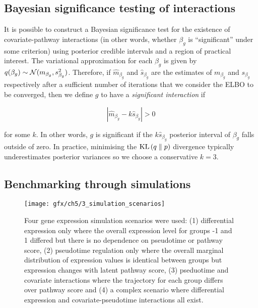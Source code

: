 \subsection{Bayesian significance testing of interactions}

It is possible to construct a Bayesian significance test for the existence of covariate-pathway interactions (in other words, whether $\beta_g$ is ``significant'' under some criterion) using posterior credible intervals and a region of practical interest. The variational approximation for each $\beta_g$ is given by $q(\beta_g) \sim \mathcal{N}(m_{\beta_g}, s^2_{\beta_g})$. Therefore, if $\hat{m}_{\beta_g}$ and $\hat{s}_{\beta_g}$ are the estimates of $m_{\beta_g}$ and $s_{\beta_g}$ respectively after a sufficient number of iterations that we consider the ELBO to be converged, then we define $g$ to have a \emph{significant interaction}
if

\begin{equation}
  | \hat{m}_{\beta_g} - k \hat{s}_{\beta_g} | > 0
\end{equation}

for some $k$. In other words, $g$ is significant if the $k \hat{s}_{\beta_g}$ posterior interval of $\beta_g$ falls outside of zero.  In practice, minimising the $\textrm{KL}\left(q\;\|\;p\right)$ divergence typically underestimates posterior variances \citep{blei2016variational} so we choose a conservative $k=3$.

\subsection{Benchmarking through simulations}

\begin{figure}
\centering
  \texttt{[image: gfx/ch5/3\_simulation\_scenarios]}
   \caption{Four gene expression simulation scenarios were used: (1) differential expression only where the overall expression level for groups -1 and 1 differed but there is no dependence on pseudotime or pathway score, (2) pseudotime regulation only where the overall marginal distribution of expression values is identical between groups but expression changes with latent pathway score, (3) pseduotime and covariate interactions where the trajectory for each group differs over pathway score and (4) a complex scenario where differential expression and covariate-pseudotime interactions all exist. } \label{fig:simulation_scenarios}
\end{figure}

